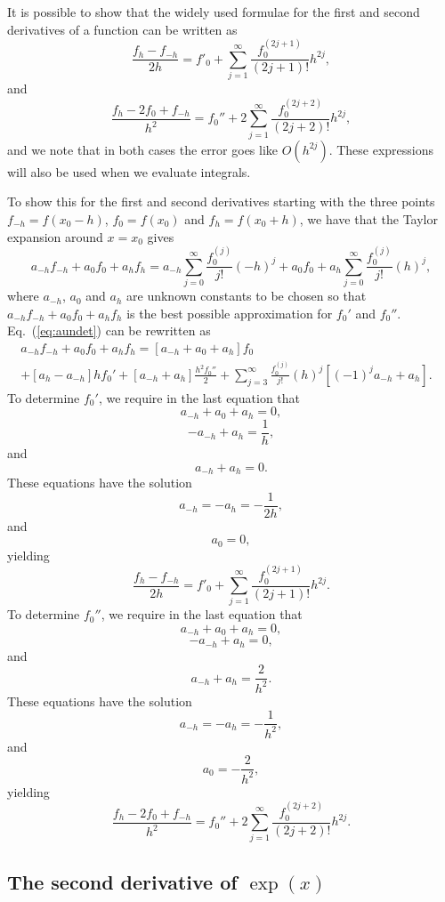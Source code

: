 It is possible to show that the widely used formulae for the first
and second derivatives of a function can be written as
\begin{equation}
   \frac{f_h-f_{-h}}{2h}=f'_0+\sum_{j=1}^{\infty}\frac{f_0^{(2j+1)}}{(2j+1)!}h^{2j},
\label{eq:firstderivative}
\end{equation}
and
\begin{equation}
 \frac{ f_h -2f_0 +f_{-h}}{h^2}=f_0''+2\sum_{j=1}^{\infty}\frac{f_0^{(2j+2)}}{(2j+2)!}h^{2j},
  \label{eq:seconderivative}
\end{equation}
and we note that in both cases the error goes like $O(h^{2j})$. 
These expressions will also be used when we evaluate integrals.

To show this for the first and second derivatives 
starting with the three points
$f_{-h}=f(x_0-h)$, $f_0=f(x_0)$ and $f_h=f(x_0+h)$, we have that the 
Taylor expansion around $x=x_0$ gives
\begin{equation}
   a_{-h}f_{-h}+a_0f_{0}+a_hf_{h}=
   a_{-h}\sum_{j=0}^{\infty}\frac{f_0^{(j)}}{j!}(-h)^j+a_0f_0+
   a_{h}\sum_{j=0}^{\infty}\frac{f_0^{(j)}}{j!}(h)^j,
   \label{eq:aundet}
\end{equation}
where $a_{-h}$, $a_0$ and $a_h$ are unknown constants to be chosen so that
$a_{-h}f_{-h}+a_0f_{0}+a_hf_{h}$ is the best possible approximation
for $f_0'$ and $f_0''$. 
Eq.~(\ref{eq:aundet}) can be rewritten as
\begin{eqnarray*}
     a_{-h}f_{-h}+a_0f_{0}+a_hf_{h}=\left[a_{-h}+a_0+a_h\right]f_0&\nonumber \\
     +\left[a_{h}-a_{-h}\right]hf_0'+\left[a_{-h}+a_h\right]\frac{h^2f_0''}{2}
     +\sum_{j=3}^{\infty}\frac{f_0^{(j)}}{j!}(h)^j\left[(-1)^ja_{-h}+a_h\right].&
\end{eqnarray*}
To determine $f_0'$, we require in the last equation that
\[
   a_{-h}+a_0+a_h=0,
\]
\[
     -a_{-h}+a_h=\frac{1}{h},
\]
and 
\[ 
     a_{-h}+a_h=0.
\]
These equations have the solution 
\[
   a_{-h}=-a_h=-\frac{1}{2h},
\]
and 
\[ 
a_0=0,
\]
yielding
\[
   \frac{f_h-f_{-h}}{2h}=f'_0+\sum_{j=1}^{\infty}\frac{f_0^{(2j+1)}}{(2j+1)!}h^{2j}.
\]
To determine $f_0''$, we require in the last equation that
\[
   a_{-h}+a_0+a_h=0,
\]
\[
     -a_{-h}+a_h=0,
\]
and 
\[ 
     a_{-h}+a_h=\frac{2}{h^2}.
\]
These equations have the solution 
\[
   a_{-h}=-a_h=-\frac{1}{h^2},
\]
and 
\[ 
a_0=-\frac{2}{h^2},
\]
yielding
\[
 \frac{ f_h -2f_0 +f_{-h}}{h^2}=f_0''+2\sum_{j=1}^{\infty}\frac{f_0^{(2j+2)}}{(2j+2)!}h^{2j}. 
\]


\subsection{The second derivative of $\exp{(x)}$}

